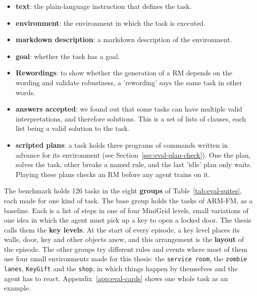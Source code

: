 \documentclass[11pt,english,listoffigures,listoftables]{tfgetsinf}
\begin{document}
\begin{itemize}
    \item \textbf{text}: the plain-language instruction that defines the task.
    \item \textbf{environment}: the environment in which the task is executed.
    \item \textbf{markdown description}: a markdown description of the environment.
    \item \textbf{goal}: whether the task has a goal.
    \item \textbf{Rewordings}: to show whether the generation of a RM depends on the wording and validate robustness, a 'rewording' says the same task in other words.
    \item \textbf{answers accepted}: we found out that some tasks can have multiple valid interpretations, and therefore solutions. This is a set of lists of clauses, each list being a valid solution to the task.
    \item \textbf{scripted plans}: a task holds three programs of commands written in advance for its environment (see Section~\ref{sec:eval-plan-check}). One the plan, solves the task, other breaks a named rule, and the last 'idle' plan only waits. Playing these plans checks an RM before any agent trains on it.  
\end{itemize}

The benchmark holds 126 tasks in the eight \textbf{groups} of Table~\ref{tab:eval-suites}, each made for one kind of task. The base group holds the tasks of ARM-FM, as a baseline. Each is a list of steps in one of four MiniGrid levels, small variations of one idea in which the agent must pick up a key to open a locked door. The thesis calls them the \textbf{key levels}. At the start of every episode, a key level places its walls, door, key and other objects anew, and this arrangement is the \textbf{layout} of the episode. The other groups try different rules and events where most of them use four small environments made for this thesis: the \texttt{service room}, the \texttt{zombie lanes}, \texttt{KeyGift} and the \texttt{shop}, in which things happen by themselves and the agent has to react. Appendix~\ref{app:eval-cards} shows one whole task as an example.
\end{document}
